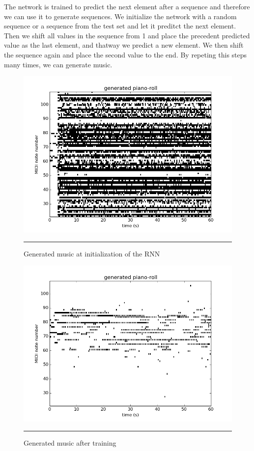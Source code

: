 The network is trained to predict the next element after a sequence and therefore we can use it to generate sequences. We initialize the network with a random sequence or a sequence from the test set and let it preditct the next element. Then we shift all values in the sequence from 1 and place the precedent predicted value as the last element, and thatway we predict a new element. We then shift the sequence again and place the second value to the end. By repeting this steps many times, we can generate music. 



    
\begin{figure}[htbp]
    \centering
\includegraphics[scale=0.5]{Figures/init_piano_roll.png}
    \rule{35em}{0.5pt}
    \caption[Generated music at initialization of the RNN]{Generated music at initialization of the RNN}
    \label{fig:init_roll}
\end{figure}


\begin{figure}[htbp]
    \centering
    \includegraphics[scale=0.5]{Figures/piano_roll.png}
    \rule{35em}{0.5pt}
    \caption[Generated music after training]{Generated music after training}
    \label{fig:piano_roll}
\end{figure}



